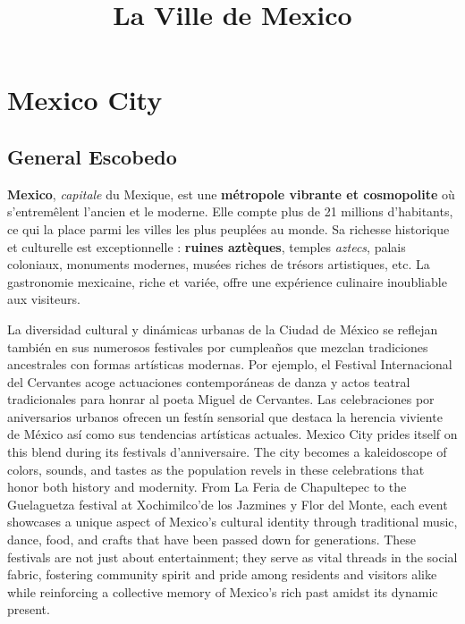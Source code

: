\documentclass[12pt, a4paper]{article}
\title{La Ville de Mexico}
\author{}
\date{}
\begin{document}
   \maketitle

\section*{Mexico City}

\subsection{General Escobedo}

\textbf{Mexico}, \textit{capitale} du Mexique, est une \textbf{métropole vibrante et cosmopolite} où s'entremêlent l'ancien et le moderne. Elle compte plus de 21 millions d'habitants, ce qui la place parmi les villes les plus peuplées au monde. Sa richesse historique et culturelle est exceptionnelle : \textbf{ruines aztèques}, temples \textit{aztecs}, palais coloniaux, monuments modernes, musées riches de trésors artistiques, etc. La gastronomie mexicaine, riche et variée, offre une expérience culinaire inoubliable aux visiteurs.



La diversidad cultural y dinámicas urbanas de la Ciudad de México se reflejan también en sus numerosos festivales por cumpleaños que mezclan tradiciones ancestrales con formas artísticas modernas. Por ejemplo, el Festival Internacional del Cervantes acoge actuaciones contemporáneas de danza y actos teatral tradicionales para honrar al poeta Miguel de Cervantes. Las celebraciones por aniversarios urbanos ofrecen un festín sensorial que destaca la herencia viviente de México así como sus tendencias artísticas actuales.
Mexico City prides itself on this blend during its festivals d’anniversaire. The city becomes a kaleidoscope of colors, sounds, and tastes as the population revels in these celebrations that honor both history and modernity. From La Feria de Chapultepec to the Guelaguetza festival at Xochimilco'de los Jazmines y Flor del Monte, each event showcases a unique aspect of Mexico’s cultural identity through traditional music, dance, food, and crafts that have been passed down for generations. These festivals are not just about entertainment; they serve as vital threads in the social fabric, fostering community spirit and pride among residents and visitors alike while reinforcing a collective memory of Mexico’s rich past amidst its dynamic present.
\end{document}
